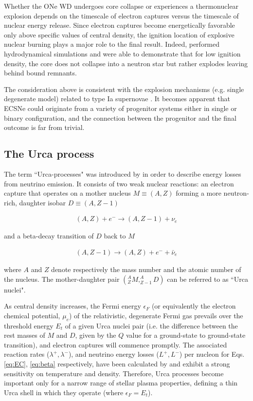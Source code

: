 \documentclass[../../main/thesis_msc.tex]{subfiles}
\begin{document}
Whether the ONe WD undergoes core collapse or experiences a thermonuclear explosion depends on the timescale of electron captures versus the timescale of nuclear energy release. Since electron captures become energetically favorable only above specific values of central density, the ignition location of explosive nuclear burning plays a major role to the final result. Indeed, \cite{Jones2016, Jones:2018ule} performed hydrodynamical simulations and were able to demonstrate that for low ignition density, the core does not collapse into a neutron star but rather explodes leaving behind bound remnants.

The consideration above is consistent with the explosion mechanisms (e.g. single degenerate model) related to type Ia supernovae \citep[for recent reviews see][]{Hillebrandt2000, Wang2012, Wang2018, Livio:2018rue}. It becomes apparent that ECSNe could originate from a variety of progenitor systems either in single or binary configuration, and the connection between the progenitor and the final outcome is far from trivial.


\subsection{The Urca process}
The term ``Urca-processes" was introduced by \cite{Gamow1941} in order to describe energy losses from neutrino emission. It consists of two weak nuclear reactions: an electron capture that operates on a mother nucleus $M \equiv (A,Z)$ forming a more neutron-rich, daughter isobar $D \equiv (A,Z-1)$

\begin{align}
    \label{eq:EC}
    (A,Z) + e^{-} \longrightarrow (A,Z-1) + \nu_{e}
\end{align}

\noindent and a beta-decay transition of $D$ back to $M$

\begin{align}
    \label{eq:beta}
    (A,Z-1) \longrightarrow (A,Z) + e^{-} + \bar{\nu}_e
\end{align}

\noindent where $A$ and $Z$ denote respectively the mass number and the atomic number of the nucleus. The mother-daughter pair $(^A _Z{M}, ^A _{Z-1}{D})$ can be referred to as ``Urca nuclei". 

As central density increases, the Fermi energy $\epsilon_F$ (or equivalently the electron chemical potential, $\mu_e$) of the relativistic, degenerate Fermi gas prevails over the threshold energy $E_t$ of a given Urca nuclei pair (i.e. the difference between the rest masses of $M$ and $D$, given by the $Q$ value for a ground-state to ground-state transition), and electron captures will commence promptly. The associated reaction rates ($\lambda^{+}, \lambda^{-}$), and neutrino energy losses ($L^{+}, L^{-}$) per nucleon for Eqs.\,\ref{eq:EC}, \ref{eq:beta} respectively, have been calculated by \cite{Tsuruta1970} and exhibit a strong sensitivity on temperature and density. Therefore, Urca processes become important only for a narrow range of stellar plasma properties, defining a thin Urca shell in which they operate (where $\epsilon_F = E_t$).
\end{document}

